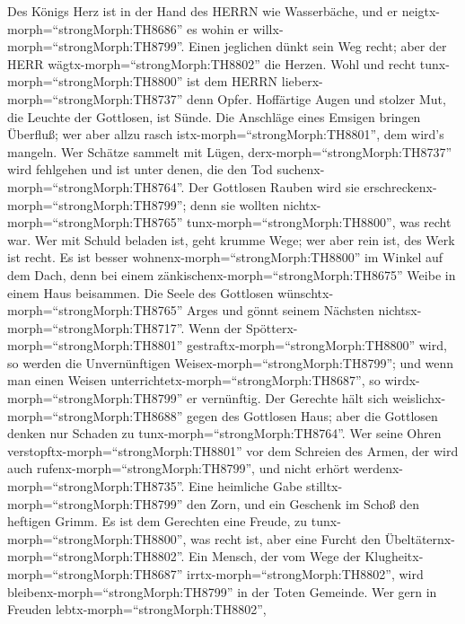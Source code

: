  Des Königs Herz ist in der Hand des HERRN wie Wasserbäche,
und er neigtx-morph=``strongMorph:TH8686'' es wohin er
willx-morph=``strongMorph:TH8799''.  Einen jeglichen dünkt
sein Weg recht; aber der HERR wägtx-morph=``strongMorph:TH8802'' die
Herzen.  Wohl und recht tunx-morph=``strongMorph:TH8800''
ist dem HERRN lieberx-morph=``strongMorph:TH8737'' denn Opfer.
 Hoffärtige Augen und stolzer Mut, die Leuchte der
Gottlosen, ist Sünde.  Die Anschläge eines Emsigen bringen
Überfluß; wer aber allzu rasch istx-morph=``strongMorph:TH8801'', dem
wird's mangeln.  Wer Schätze sammelt mit Lügen,
derx-morph=``strongMorph:TH8737'' wird fehlgehen und ist unter denen,
die den Tod suchenx-morph=``strongMorph:TH8764''.  Der
Gottlosen Rauben wird sie erschreckenx-morph=``strongMorph:TH8799'';
denn sie wollten nichtx-morph=``strongMorph:TH8765''
tunx-morph=``strongMorph:TH8800'', was recht war.  Wer mit
Schuld beladen ist, geht krumme Wege; wer aber rein ist, des Werk ist
recht.  Es ist besser wohnenx-morph=``strongMorph:TH8800''
im Winkel auf dem Dach, denn bei einem
zänkischenx-morph=``strongMorph:TH8675'' Weibe in einem Haus beisammen.
 Die Seele des Gottlosen
wünschtx-morph=``strongMorph:TH8765'' Arges und gönnt seinem Nächsten
nichtsx-morph=``strongMorph:TH8717''.  Wenn der
Spötterx-morph=``strongMorph:TH8801''
gestraftx-morph=``strongMorph:TH8800'' wird, so werden die
Unvernünftigen Weisex-morph=``strongMorph:TH8799''; und wenn man einen
Weisen unterrichtetx-morph=``strongMorph:TH8687'', so
wirdx-morph=``strongMorph:TH8799'' er vernünftig.  Der
Gerechte hält sich weislichx-morph=``strongMorph:TH8688'' gegen des
Gottlosen Haus; aber die Gottlosen denken nur Schaden zu
tunx-morph=``strongMorph:TH8764''.  Wer seine Ohren
verstopftx-morph=``strongMorph:TH8801'' vor dem Schreien des Armen, der
wird auch rufenx-morph=``strongMorph:TH8799'', und nicht erhört
werdenx-morph=``strongMorph:TH8735''.  Eine heimliche Gabe
stilltx-morph=``strongMorph:TH8799'' den Zorn, und ein Geschenk im Schoß
den heftigen Grimm.  Es ist dem Gerechten eine Freude, zu
tunx-morph=``strongMorph:TH8800'', was recht ist, aber eine Furcht den
Übeltäternx-morph=``strongMorph:TH8802''.  Ein Mensch, der
vom Wege der Klugheitx-morph=``strongMorph:TH8687''
irrtx-morph=``strongMorph:TH8802'', wird
bleibenx-morph=``strongMorph:TH8799'' in der Toten Gemeinde.
 Wer gern in Freuden lebtx-morph=``strongMorph:TH8802'',
